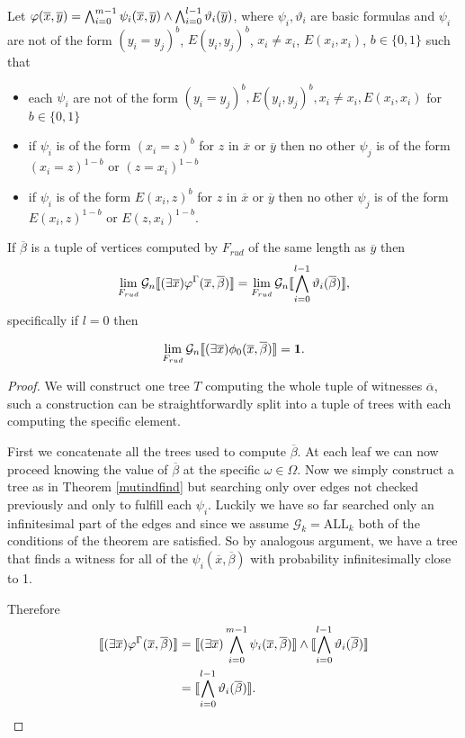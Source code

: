 \begin{thrm}
Let $\varphi(\overline x,\overline y)=\bigwedge_{i=0}^{m-1}\psi_i(\overline x,\overline y)\land \bigwedge_{i=0}^{l-1}\vartheta_i(\overline y)$, where $\psi_i,\vartheta_i$ are basic formulas and $\psi_i$ are not of the form $(y_i=y_j)^b$, $E(y_i,y_j)^b$, $x_i\not= x_i$, $E(x_i,x_i)$, $b\in\{0,1\}$ such that
\begin{itemize}
\item each $\psi_i$ are not of the form $(y_i=y_j)^b,E(y_i,y_j)^b,x_i\not = x_i, E(x_i,x_i)$ for $b\in\{0,1\}$
\item if $\psi_i$ is of the form $(x_i=z)^b$ for $z$ in $\overline x$ or $\overline y$ then no other $\psi_j$ is of the form $(x_i=z)^{1-b}$ or $(z=x_i)^{1-b}$
\item if $\psi_i$ is of the form $E(x_i,z)^b$ for $z$ in $\overline x$ or $\overline y$ then no other $\psi_j$ is of the form $E(x_i,z)^{1-b}$ or $E(z,x_i)^{1-b}$.
\end{itemize}

If $\overline \beta$ is a tuple of vertices computed by $F_{rud}$ of the same length as $\overline y$ then \[\lim_{F_{rud}}\mathcal{G}_n\llbracket(\exists \overline x)\varphi^\Gamma(\overline x,\overline \beta)\rrbracket=\lim_{F_{rud}}\mathcal{G}_n\llbracket\bigwedge_{i=0}^{l-1}\vartheta_i(\overline \beta)\rrbracket,\] specifically if $l=0$ then

\[\lim_{F_{rud}}\mathcal{G}_n\llbracket(\exists \overline x)\phi_0(\overline x,\overline \beta)\rrbracket=\textbf{1}.\]
\end{thrm}
\begin{proof} We will construct one tree $T$ computing the whole tuple of witnesses $\overline \alpha$, such a construction can be straightforwardly split into a tuple of trees with each computing the specific element.

First we concatenate all the trees used to compute $\overline \beta$. At each leaf we can now proceed knowing the value of $\overline \beta$ at the specific $\omega\in\Omega$. Now we simply construct a tree as in Theorem \ref{mutindfind} but searching only over edges not checked previously and only to fulfill each $\psi_i$. Luckily we have so far searched only an infinitesimal part of the edges and since we assume $\mathcal{G}_k=\text{ALL}_k$ both of the conditions of the theorem are satisfied. So by analogous argument, we have a tree that finds a witness for all of the $\psi_i(\overline x,\overline \beta)$ with probability infinitesimally close to 1.

Therefore
\begin{align}
\llbracket(\exists \overline x)\varphi^\Gamma(\overline x,\overline \beta)\rrbracket&=\llbracket(\exists \overline x)\bigwedge_{i=0}^{m-1}\psi_i(\overline x,\overline \beta)\rrbracket \land \llbracket\bigwedge_{i=0}^{l-1}\vartheta_i(\overline \beta)\rrbracket\\
&=\llbracket\bigwedge_{i=0}^{l-1}\vartheta_i(\overline \beta)\rrbracket.
\end{align}
\end{proof}

